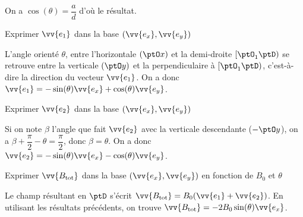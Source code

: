 
\begin{corrige}
On a $\cos(\theta) = \dfrac{a}{d}$ d'où le résultat.
\end{corrige}


\begin{enonce}
Exprimer $\vv{e_1}$ dans la base $(\vv{e_x}, \vv{e_y})$
\end{enonce}


\begin{corrige}
L'angle orienté $\theta$, entre l'horizontale $(\ptO x)$ et la demi-droite $[\ptO_1  \ptD)$ se retrouve entre la verticale $(\ptO y)$ et la perpendiculaire à $[\ptO_1 \ptD)$, c'est-à-dire la direction du vecteur $\vv{e_1}$.
On a donc $\vv{e_1}=-\sin(\theta)\vv{e_x} + \cos(\theta)\vv{e_y}$.
\end{corrige}


\begin{enonce}
Exprimer $\vv{e_2}$ dans la base $(\vv{e_x}, \vv{e_y})$
\end{enonce}


\begin{corrige}
Si on note $\beta$ l'angle que fait $\vv{e_2}$ avec la verticale descendante ($-\ptO y$), on a $\beta + \dfrac{\pi}{2} - \theta = \dfrac{\pi}{2}$, donc $\beta =\theta$. On a donc $\vv{e_2}=-\sin(\theta)\vv{e_x} - \cos(\theta)\vv{e_y}$.
\end{corrige}


\begin{enonce}
Exprimer $\vv{B_{\text{tot}}}$ dans la base $(\vv{e_x}, \vv{e_y})$ en fonction de $B_0$ et $\theta$
\end{enonce}


\begin{corrige}
Le champ résultant en $\ptD$ s'écrit $\vv{B_{\text{tot}}}=B_0(\vv{e_1}+\vv{e_2})$. En utilisant les résultats précédents, on trouve $\vv{B_{\text{tot}}}=-2B_0 \sin(\theta)\vv{e_x}$.
\end{corrige}



